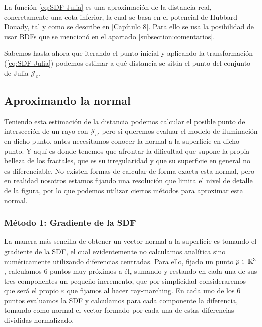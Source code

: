 La función \ref{eq:SDF-Julia} es una aproximación de la distancia real, concretamente una cota inferior, la cual se basa en el potencial de Hubbard-Douady, tal y como se describe en \cite{Hubbard-Douady}[Capítulo 8]. Para ello se usa la posibilidad de usar BDFs que se mencionó en el apartado \ref{subsection:comentarios}.

Sabemos hasta ahora que iterando el punto inicial y aplicando la transformación (\ref{eq:SDF-Julia}) podemos estimar a qué distancia se sitúa el punto del conjunto de Julia $\mathcal{J}_c$. 

\subsection{Aproximando la normal}
\label{subsection:normal-sdf}

Teniendo esta estimación de la distancia podemos calcular el posible punto de intersección de un rayo con $\mathcal{J}_c$, pero si queremos evaluar el modelo de iluminación en dicho punto, antes necesitamos conocer la normal a la superficie en dicho punto. Y aquí es donde tenemos que afrontar la dificultad que supone la propia belleza de los fractales, que es su irregularidad y que su superficie en general no es diferenciable. No existen formas de calcular de forma exacta esta normal, pero en realidad nosotros estamos fijando una resolución que limita el nivel de detalle de la figura, por lo que podemos utilizar ciertos métodos para aproximar esta normal.

\subsubsection{Método 1: Gradiente de la SDF}

La manera más sencilla de obtener un vector normal a la superficie es tomando el gradiente de la SDF, el cual evidentemente no calculamos analítica sino numéricamente utilizando diferencias centradas. Para ello, fijado un punto $p\in\mathbb{R}^3$, calculamos 6 puntos muy próximos a él, sumando y restando en cada una de sus tres componentes un pequeño incremento, que por simplicidad consideraremos que será el propio $\varepsilon$ que fijamos al hacer ray-marching. En cada uno de los 6 puntos evaluamos la SDF y calculamos para cada componente la diferencia, tomando como normal el vector formado por cada una de estas diferencias divididas normalizado.

